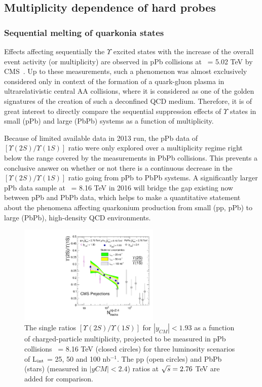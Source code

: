 \subsection{Multiplicity dependence of hard probes}

\subsubsection{Sequential melting of quarkonia states}

Effects affecting sequentially the $\Upsilon$ excited states with the increase 
of the overall event activity (or multiplicity) are observed in pPb collisions 
at \roots\ = 5.02 TeV by CMS~\cite{Chatrchyan:2013nza}. Up to these measurements, 
such a phenomenon was almost exclusively considered only in context of the formation 
of a quark-gluon plasma in ultrarelativistic central AA collisions, 
where it is considered as one of the golden signatures of the creation of 
such a deconfined QCD medium. Therefore, it is of great interest to directly
compare the sequential suppression effects of $\Upsilon$ states in small (pPb) and
large (PbPb) systems as a function of multiplicity.

Because of limited available data in 2013 run, the pPb data of 
$[\Upsilon(2S) / \Upsilon(1S)]$ ratio were only explored over a multiplicity 
regime right below the range covered by the measurements in PbPb collisions.
This prevents a conclusive answer on whether or not there is a continuous decrease
in the $[\Upsilon(2S) / \Upsilon(1S)]$ ratio going from pPb to PbPb systems.
A significantly larger pPb data sample at \rootsNN\ = 8.16 TeV 
in 2016 will bridge the gap existing now between pPb and PbPb data, which 
helps to make a quantitative statement about the phenomena affecting 
quarkonium production from small (pp, pPb) to large (PbPb), high-density QCD environments. 


\begin{figure}[thb]
  \begin{center}
    \includegraphics[width=0.6\textwidth]{figures/Upsilon_pPb_proj_combineLumi.pdf}
    \caption{ The single ratios $[\Upsilon(2S) / \Upsilon(1S)]$ for $|y_{CM}|<1.93$ 
    as a function of charged-particle multiplicity, projected to be measured in pPb collisions 
    \rootsNN\ = 8.16 TeV (closed circles) for three luminosity scenarios of L$_{\rm int}$ = 
    25, 50 and 100 nb$^{-1}$. The pp (open circles) and PbPb (stars) (measured in $|yCM|<2.4$) 
    ratios at $\sqrt{s} = 2.76$ TeV are added for comparison.
    }
    \label{fig:UpsilonvsNtrk}
  \end{center}
\end{figure} 

